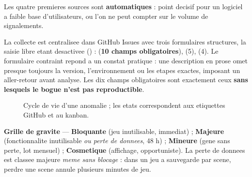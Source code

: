 \vspace{3pt}
Les quatre premieres sources sont \textbf{automatiques} : point decisif pour un logiciel a faible
base d'utilisateurs, ou l'on ne peut compter sur le volume de signalements.

La collecte est centralisee dans GitHub Issues avec trois formulaires structures, la saisie libre
etant desactivee () :  (\textbf{10 champs
obligatoires}),  (5),  (4). Le
formulaire contraint repond a un constat pratique : une description en prose omet presque toujours
la version, l'environnement ou les etapes exactes, imposant un aller-retour avant analyse. Les dix
champs obligatoires sont exactement ceux \textbf{sans lesquels le bogue n'est pas reproductible}.

\begin{figure}[H]
\centering
{}
\caption{Cycle de vie d'une anomalie ; les etats correspondent aux etiquettes GitHub et au kanban.}
\end{figure}

\textbf{Grille de gravite} --- \textcolor{RougeKo}{\textbf{Bloquante}} (jeu inutilisable,
immediat) ; \textcolor{OrangeAlerte}{\textbf{Majeure}} (fonctionnalite inutilisable \emph{ou perte
de donnees}, 48 h) ; \textbf{Mineure} (gene sans perte, lot mensuel) ; \textbf{Cosmetique}
(affichage, opportuniste). La perte de donnees est classee majeure \emph{meme sans blocage} : dans
un jeu a sauvegarde par scene, perdre une scene annule plusieurs minutes de jeu.

